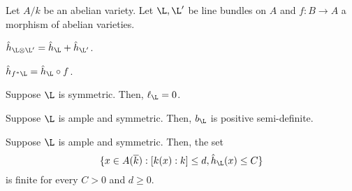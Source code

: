 \documentclass[11pt]{article}
\begin{document}
\begin{theorem}\label{Pairing_Thm}
Let $A/k$ be an abelian variety. Let $\L,\L'$ be line bundles on $A$ and $f: B\to A$ a morphism of abelian varieties.
\begin{enum}{\arabic}
\item $\hat{h}_{\L\tensor\L'}=\hat{h}_{\L}+\hat{h}_{\L'}$.
\item $\hat{h}_{f^*\L}=\hat{h}_{\L}\circ f$.
\item Suppose $\L$ is symmetric. Then, $\l_{\L}=0$.
\item Suppose $\L$ is ample and symmetric. Then, $b_{\L}$ is positive semi-definite.
\item Suppose $\L$ is ample and symmetric. Then, the set
$$\{x\in A(\ov{k}) : [k(x):k]\leq d,\hat{h}_{\L}(x)\leq C\}$$
is finite for every $C>0$ and $d\geq0$.
\end{enum}
\end{theorem}
\end{document}
